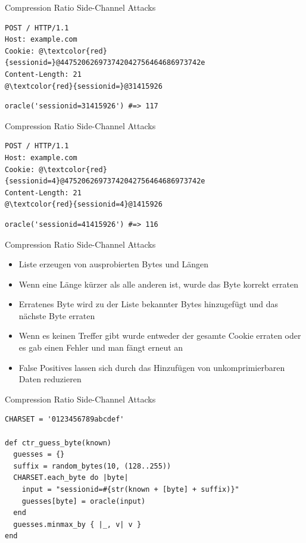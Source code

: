 \documentclass[presentation]{beamer}
\begin{document}
\begin{frame}[fragile,label={sec:orgbe04116}]{Compression Ratio Side-Channel Attacks}
 \begin{verbatim}
POST / HTTP/1.1
Host: example.com
Cookie: @\textcolor{red}{sessionid=}@447520626973742042756464686973742e
Content-Length: 21
@\textcolor{red}{sessionid=}@31415926
\end{verbatim}

\begin{verbatim}
oracle('sessionid=31415926') #=> 117
\end{verbatim}
\end{frame}

\begin{frame}[fragile,label={sec:orgd2975a4}]{Compression Ratio Side-Channel Attacks}
 \begin{verbatim}
POST / HTTP/1.1
Host: example.com
Cookie: @\textcolor{red}{sessionid=4}@47520626973742042756464686973742e
Content-Length: 21
@\textcolor{red}{sessionid=4}@1415926
\end{verbatim}

\begin{verbatim}
oracle('sessionid=41415926') #=> 116
\end{verbatim}
\end{frame}

\begin{frame}[label={sec:org5b46d46}]{Compression Ratio Side-Channel Attacks}
\begin{itemize}
\item Liste erzeugen von ausprobierten Bytes und Längen
\item Wenn eine Länge kürzer als alle anderen ist, wurde das Byte korrekt
erraten
\item Erratenes Byte wird zu der Liste bekannter Bytes hinzugefügt und das
nächste Byte erraten
\item Wenn es keinen Treffer gibt wurde entweder der gesamte Cookie
erraten oder es gab einen Fehler und man fängt erneut an
\item False Positives lassen sich durch das Hinzufügen von
unkomprimierbaren Daten reduzieren
\end{itemize}
\end{frame}

\begin{frame}[fragile,label={sec:org1f80df3}]{Compression Ratio Side-Channel Attacks}
 \begin{verbatim}
CHARSET = '0123456789abcdef'

def ctr_guess_byte(known)
  guesses = {}
  suffix = random_bytes(10, (128..255))
  CHARSET.each_byte do |byte|
    input = "sessionid=#{str(known + [byte] + suffix)}"
    guesses[byte] = oracle(input)
  end
  guesses.minmax_by { |_, v| v }
end
\end{verbatim}
\end{frame}
\end{document}
